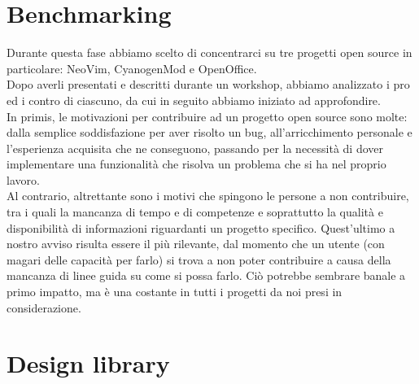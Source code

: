 \documentclass[12pt]{article} %
\begin{document}
\section{Benchmarking}
Durante questa fase abbiamo scelto di concentrarci su tre progetti open source in particolare: NeoVim, CyanogenMod e OpenOffice.\\
Dopo averli presentati e descritti durante un workshop, abbiamo analizzato i pro ed i contro di ciascuno, da cui in seguito abbiamo iniziato ad approfondire.\\
In primis, le motivazioni per contribuire ad un progetto open source sono molte: dalla semplice soddisfazione per aver risolto un bug, all'arricchimento personale e l'esperienza acquisita che ne conseguono, passando per la necessità di dover implementare una funzionalità che risolva un problema che si ha nel proprio lavoro.\\
Al contrario, altrettante sono i motivi che spingono le persone a non contribuire, tra i quali la mancanza di tempo e di competenze e soprattutto la qualità e disponibilità di informazioni riguardanti un progetto specifico. Quest'ultimo a nostro avviso risulta essere il più rilevante, dal momento che un utente (con magari delle capacità per farlo) si trova a non poter contribuire a causa della mancanza di linee guida su come si possa farlo. Ciò potrebbe sembrare banale a primo impatto, ma è una costante in tutti i progetti da noi presi in considerazione.
\newpage

\section{Design library}
\end{document}
